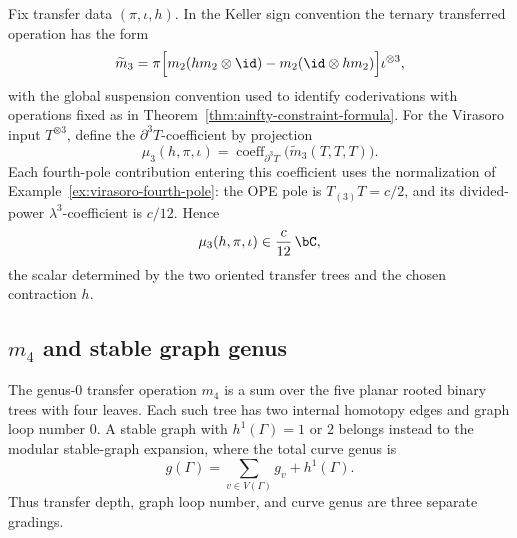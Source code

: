 \begin{computation}
\label{comp:virasoro-m3}
Fix transfer data \((\pi,\iota,h)\).  In the Keller sign convention the
ternary transferred operation has the form
\[
\widetilde m_3
=\pi\Bigl[
m_2(hm_2\otimes\id)
-m_2(\id\otimes hm_2)
\Bigr]\iota^{\otimes 3},
\]
with the global suspension convention used to identify coderivations
with operations fixed as in Theorem~\ref{thm:ainfty-constraint-formula}.
For the Virasoro input \(T^{\otimes 3}\), define the
\(\partial^3T\)-coefficient by projection
\[
\mu_3(h,\pi,\iota)
=\operatorname{coeff}_{\partial^3T}
\bigl(\widetilde m_3(T,T,T)\bigr).
\]
Each fourth-pole contribution entering this coefficient uses the
normalization of Example~\ref{ex:virasoro-fourth-pole}: the OPE pole is
\(T_{(3)}T=c/2\), and its divided-power \(\lambda^3\)-coefficient is
\(c/12\). Hence
\[
\mu_3(h,\pi,\iota)
\in \frac{c}{12}\,\bC,
\]
the scalar determined by the two oriented transfer trees and the
chosen contraction \(h\).
\end{computation}

\subsection{\texorpdfstring{$m_4$ and stable graph genus}{m4 and stable graph genus}}

\begin{remark}
\label{rem:m4-transfer-stable-genus}
The genus-\(0\) transfer operation \(m_4\) is a sum over the five
planar rooted binary trees with four leaves.  Each such tree has two
internal homotopy edges and graph loop number \(0\).  A stable graph
with \(h^1(\Gamma)=1\) or \(2\) belongs instead to the modular
stable-graph expansion, where the total curve genus is
\[
g(\Gamma)=\sum_{v\in V(\Gamma)}g_v+h^1(\Gamma).
\]
Thus transfer depth, graph loop number, and curve genus are three
separate gradings.
\end{remark}

